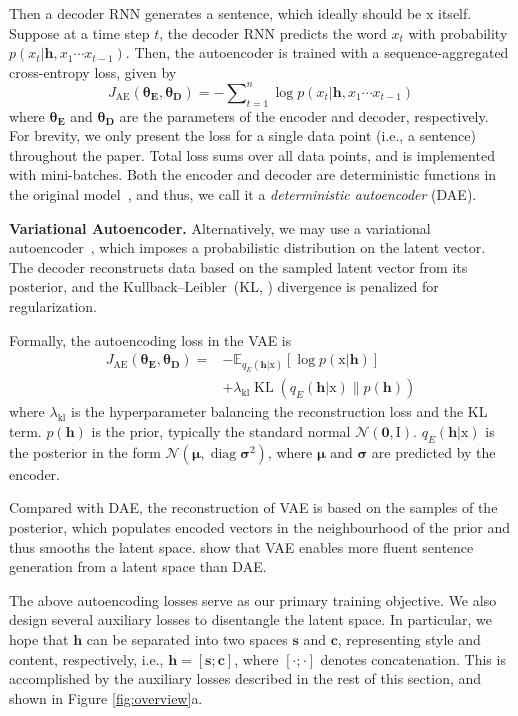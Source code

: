 \documentclass[11pt,a4paper]{article}
\newcommand{\rmx}{\mathrm x}
\newcommand{\loss}[1]{J_{\text{#1}}}
\newcommand{\hyp}[1]{\lambda_{\text{#1}}}
\newcommand{\nnweight}[1]{\bm{\theta_{\text{#1}}}}
\begin{document}
Then a decoder RNN generates a sentence, which ideally should be $\rmx$ itself.
Suppose at a time step $t$, the decoder RNN predicts the word $x_t$ with probability $p(x_t|\bm h, x_1\cdots x_{t-1})$. Then, the autoencoder is trained with a sequence-aggregated cross-entropy loss, given by
\begin{equation}\nonumber
	\loss{AE}(\nnweight{E},\nnweight{D})= -\sum\nolimits_{t=1}^n \log p(x_t|\bm h, x_1\cdots x_{t-1})
\end{equation}
where $\nnweight{E}$ and $\nnweight{D}$ are the parameters of the encoder and decoder, respectively.
For brevity, we only present the loss for a single data point (i.e., a sentence) throughout the paper. Total loss sums over all data points, and is implemented with mini-batches.
Both the encoder and decoder are deterministic functions in the original model~\cite{rumelhart1985learning}, and thus, we call it a \textit{deterministic autoencoder} (DAE).


\textbf{Variational Autoencoder.} Alternatively, we may use a variational autoencoder~\cite[VAE,][]{kingma2013auto}, which imposes a probabilistic distribution on the latent vector. The decoder reconstructs data based on the sampled latent vector from its posterior, and the Kullback--Leibler~(KL, \citeyear{kullback1951information}) divergence  is penalized for regularization.

Formally, the autoencoding loss in the VAE is
\begin{align}
	\loss{AE}(\nnweight{E}, \nnweight{D}) = & - \mathbb{E}_{q_{E}(\bm h|\rmx)} [\log p(\rmx|\bm h)]  \nonumber \\ \nonumber
	                                        & + \hyp{kl}\operatorname{KL}(q_{E}(\bm h|\rmx)\|p(\bm h))
\end{align}
where $\hyp{kl}$ is the hyperparameter balancing the reconstruction loss and the KL term. $p(\bm h)$ is the prior, typically the standard normal  $\mathcal{N}(\bm 0,\mathrm I)$. $q_E(\bm h|\mathrm x)$ is the posterior in the form $\mathcal{N}(\bm \mu,\operatorname{diag} \bm\sigma^2)$, where $\bm\mu$ and $\bm\sigma$ are predicted by the encoder.

Compared with DAE, the reconstruction of VAE is based on the samples of the posterior, which populates encoded vectors in the neighbourhood of the prior and thus smooths the latent space.
\citet{bowman2016generating} show that VAE enables more fluent sentence generation from a latent space than DAE.

The above autoencoding losses serve as our primary training objective.
We also design several auxiliary losses to disentangle the latent space. In particular, we hope that $\bm h$ can be separated into two spaces $\bm s$ and $\bm c$, representing style and content, respectively, i.e., $\bm h = [\bm s ; \bm c]$, where $[\cdot;\cdot]$ denotes concatenation.
This is accomplished by the auxiliary losses described in the rest of this section, and shown in Figure \ref{fig:overview}a.
\end{document}
